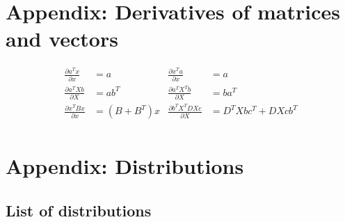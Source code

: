 \appendix
\section{Appendix: Derivatives of matrices and vectors} 
\begin{prop}
	\begin{align*}
		\frac{\partial a^T x}{ \partial x } &= a & \frac{\partial x^T a}{ \partial x } &= a\\
		\frac{\partial a^T X b}{ \partial X } &= ab^T & \frac{\partial a^T X^T b}{ \partial X } &= ba^T \\
		\frac{\partial x^T B x}{ \partial x } &= (B + B^T)x  & \frac{\partial b^T X^T D X c}{ \partial X } &= D^T X bc^T + DXcb^T \\
	\end{align*}
\end{prop}

\section{Appendix: Distributions} 
\subsection{List of distributions}
